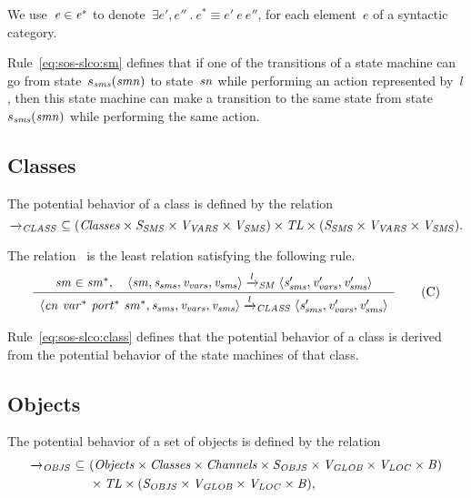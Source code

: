 \noindent
We use~$\it{e} \in \it{e^*}$ to denote~$\exists e', e'' ~ . ~ e^* \equiv e'~e~e''$, for each element~$e$ of a syntactic category.

Rule~\eqref{eq:sos-slco:sm} defines that if one of the transitions of a state machine can go from state~$s_{\it{sms}}(\it{smn})$ to state~$\it{sn}$ while performing an action represented by~$l$, then this state machine can make a transition to the same state from state~$s_{\it{sms}}(\it{smn})$ while performing the same action.

\subsection{Classes}
The potential behavior of a class is defined by the relation
%
\[
\xrightarrow{\it{}}_{\it{CLASS}} ~ \subseteq (\it Classes \times S_{\it{SMS}} \times V_{\it{VARS}} \times V_{\it{SMS}}) \times \it TL \times (S_{\it{SMS}} \times V_{\it{VARS}} \times V_{\it{SMS}}).
\]

\noindent
The relation~\ClassRelation{} is the least relation satisfying the following rule.
%
\begin{equation*}
 \frac{ \begin{array}[c]{c} 
\it{sm} \in \it{sm^*}, \quad
\langle \it{sm}, s_{\it{sms}}, v_{\it{vars}}, v_{\it{sms}} \rangle
\xrightarrow{\it{l}}_{\it{SM}}
\langle s_{\it{sms}}', v_{\it{vars}}', v_{\it{sms}}' \rangle
 \end{array} }{ \begin{array}[c]{c} 
\langle \it{cn}~\it{var^*}~\it{port^*}~\it{sm^*}, s_{\it{sms}}, v_{\it{vars}}, v_{\it{sms}} \rangle
\xrightarrow{\it{l}}_{\it{CLASS}}
\langle s_{\it{sms}}', v_{\it{vars}}', v_{\it{sms}}' \rangle
 \end{array} } 
\tag{C}
\label{eq:sos-slco:class}
\end{equation*}

\noindent
Rule~\eqref{eq:sos-slco:class} defines that the potential behavior of a class is derived from the potential behavior of the state machines of that class.

\subsection{Objects}
The potential behavior of a set of objects is defined by the relation
%
\begin{align*}
\xrightarrow{\it{}}_{\it{OBJS}} ~ \subseteq & ~ (\it Objects \times \it Classes \times \it Channels \times S_{\it{OBJS}} \times V_{\it{GLOB}} \times V_{\it{LOC}} \times B)\\
 & ~ \times \it TL \times (S_{\it{OBJS}} \times V_{\it{GLOB}} \times V_{\it{LOC}} \times B),
\end{align*}

